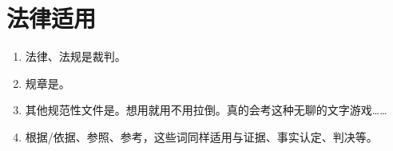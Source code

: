 \section{法律适用}
\begin{enumerate}
  \item 法律、法规是裁判。
  \item 规章是。
  \item 其他规范性文件是。想用就用不用拉倒。真的会考这种无聊的文字游戏……
  \item 根据/依据、参照、参考，这些词同样适用与证据、事实认定、判决等。
\end{enumerate}
